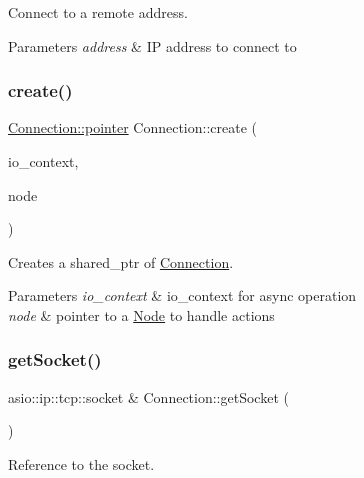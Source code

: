 Connect to a remote address. 


\begin{DoxyParams}{Parameters}
{\em address} & IP address to connect to \\
\hline
\end{DoxyParams}
\mbox{\label{classConnection_a31f4b3c4ce970776f98b5fb20bdf3ef1}} 
\subsubsection{\texorpdfstring{create()}{create()}}
{\footnotesize\ttfamily \mbox{\hyperlink{classConnection_a1bb6cd8924ff091e9b053e3368735c9c}{Connection\+::pointer}} Connection\+::create (\begin{DoxyParamCaption}\item[{asio\+::io\+\_\+context \&}]{io\+\_\+context,  }\item[{\mbox{\hyperlink{classNode}{Node}} $\ast$}]{node }\end{DoxyParamCaption})\hspace{0.3cm}{\ttfamily [static]}}



Creates a shared\+\_\+ptr of \mbox{\hyperlink{classConnection}{Connection}}. 


\begin{DoxyParams}{Parameters}
{\em io\+\_\+context} & io\+\_\+context for async operation \\
\hline
{\em node} & pointer to a \mbox{\hyperlink{classNode}{Node}} to handle actions \\
\hline
\end{DoxyParams}
\mbox{\label{classConnection_ac854436a3a6fdf7fdb16be04b9696447}} 
\subsubsection{\texorpdfstring{get\+Socket()}{getSocket()}}
{\footnotesize\ttfamily asio\+::ip\+::tcp\+::socket \& Connection\+::get\+Socket (\begin{DoxyParamCaption}{ }\end{DoxyParamCaption})}



Reference to the socket. 

